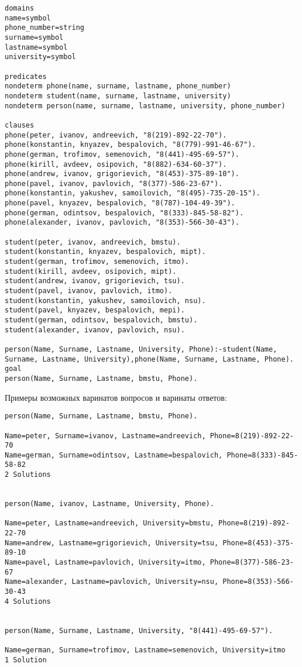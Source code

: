 \begin{lstlisting}
domains
name=symbol
phone_number=string
surname=symbol
lastname=symbol
university=symbol

predicates
nondeterm phone(name, surname, lastname, phone_number)
nondeterm student(name, surname, lastname, university)
nondeterm person(name, surname, lastname, university, phone_number)

clauses
phone(peter, ivanov, andreevich, "8(219)-892-22-70").
phone(konstantin, knyazev, bespalovich, "8(779)-991-46-67"). 
phone(german, trofimov, semenovich, "8(441)-495-69-57").     
phone(kirill, avdeev, osipovich, "8(882)-634-60-37").        
phone(andrew, ivanov, grigorievich, "8(453)-375-89-10").     
phone(pavel, ivanov, pavlovich, "8(377)-586-23-67").
phone(konstantin, yakushev, samoilovich, "8(495)-735-20-15").
phone(pavel, knyazev, bespalovich, "8(787)-104-49-39").      
phone(german, odintsov, bespalovich, "8(333)-845-58-82").    
phone(alexander, ivanov, pavlovich, "8(353)-566-30-43").
   
student(peter, ivanov, andreevich, bmstu).
student(konstantin, knyazev, bespalovich, mipt).
student(german, trofimov, semenovich, itmo).
student(kirill, avdeev, osipovich, mipt).
student(andrew, ivanov, grigorievich, tsu).
student(pavel, ivanov, pavlovich, itmo).
student(konstantin, yakushev, samoilovich, nsu).
student(pavel, knyazev, bespalovich, mepi).
student(german, odintsov, bespalovich, bmstu).
student(alexander, ivanov, pavlovich, nsu).

person(Name, Surname, Lastname, University, Phone):-student(Name, Surname, Lastname, University),phone(Name, Surname, Lastname, Phone).
goal	
person(Name, Surname, Lastname, bmstu, Phone).
\end{lstlisting}

Примеры возможных варинатов вопросов и варинаты ответов:
\begin{lstlisting}
person(Name, Surname, Lastname, bmstu, Phone).

Name=peter, Surname=ivanov, Lastname=andreevich, Phone=8(219)-892-22-70
Name=german, Surname=odintsov, Lastname=bespalovich, Phone=8(333)-845-58-82
2 Solutions


person(Name, ivanov, Lastname, University, Phone).

Name=peter, Lastname=andreevich, University=bmstu, Phone=8(219)-892-22-70
Name=andrew, Lastname=grigorievich, University=tsu, Phone=8(453)-375-89-10
Name=pavel, Lastname=pavlovich, University=itmo, Phone=8(377)-586-23-67
Name=alexander, Lastname=pavlovich, University=nsu, Phone=8(353)-566-30-43
4 Solutions


person(Name, Surname, Lastname, University, "8(441)-495-69-57").

Name=german, Surname=trofimov, Lastname=semenovich, University=itmo
1 Solution
\end{lstlisting}